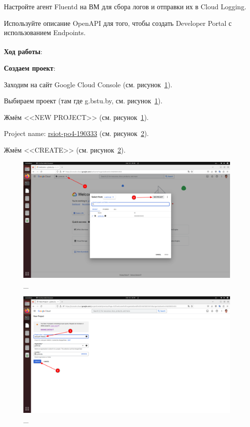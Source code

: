 \documentclass[12pt, a4paper, simple]{eskdtext}
\begin{document}
  Настройте агент Fluentd на ВМ для сбора логов и отправки их в Cloud Logging.

  Используйте описание OpenAPI для того, чтобы создать Developer Portal с использованием Endpoints.

  \paragraph{} \textbf{Ход работы}:

  \newpage
  \textbf{Создаем проект}:

  Заходим на сайт Google Cloud Console \cite{GoogleCloudConsole} (см. рисунок~\ref{fig:1}).

  Выбираем проект (там где g.bstu.by, см. рисунок~\ref{fig:1}).

  Жмём <<NEW PROJECT>> (см. рисунок~\ref{fig:1}).

  Project name: \underline{rsiot-po4-190333} (см. рисунок~\ref{fig:2}).

  Жмём <<CREATE>> (см. рисунок~\ref{fig:2}).

  \begin{figure}[!h]
    \centering
    \includegraphics[width=16cm]
    {images/2023-02-25_20-47-00.png}
    \caption{\_}
    \label{fig:1}
  \end{figure}

  \begin{figure}[!h]
    \centering
    \includegraphics[width=16cm]
    {images/2023-02-25_20-49-58.png}
    \caption{\_}
    \label{fig:2}
  \end{figure}
\end{document}
